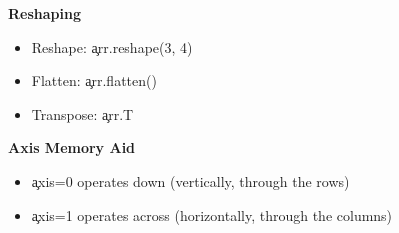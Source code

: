 \begin{tcolorbox}[
    title=NumPy Essentials for Architects,
    colframe=blue,
    colback = white,
    arc=2mm
]
\textbf{Reshaping}
\begin{itemize}
\item Reshape: \c{arr.reshape(3, 4)}
\item Flatten: \c{arr.flatten()}
\item Transpose: \c{arr.T}
\end{itemize}

\textbf{Axis Memory Aid}
\begin{itemize}
\item \c{axis=0} operates down (vertically, through the rows)
\item \c{axis=1} operates across (horizontally, through the columns)
\end{itemize}
\end{tcolorbox}


